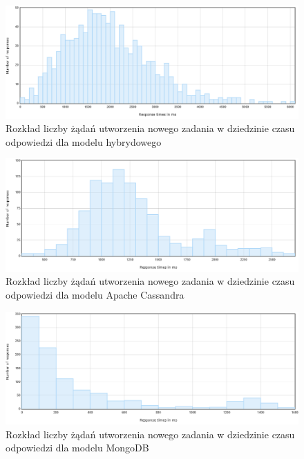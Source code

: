 \begin{figure}[!ht]
\centering
\includegraphics[width=\textwidth]{figures/flotResponseTimeDistribution_hybrid_save.png}
\caption{Rozkład liczby żądań utworzenia nowego zadania w dziedzinie czasu odpowiedzi dla modelu hybrydowego}
\label{fig:hybridSaveTaskDistribution}
\end{figure}

\begin{figure}[!ht]
\centering
\includegraphics[width=\textwidth]{figures/flotResponseTimeDistribution_cass_save.png}
\caption{Rozkład liczby żądań utworzenia nowego zadania w dziedzinie czasu odpowiedzi dla modelu Apache Cassandra}
\label{fig:cassandraSaveTaskDistribution}
\end{figure}

\begin{figure}[!ht]
\centering
\includegraphics[width=\textwidth]{figures/flotResponseTimeDistribution_mongo_save.png}
\caption{Rozkład liczby żądań utworzenia nowego zadania w dziedzinie czasu odpowiedzi dla modelu MongoDB}
\label{fig:mongoSaveTaskDistribution}
\end{figure}


